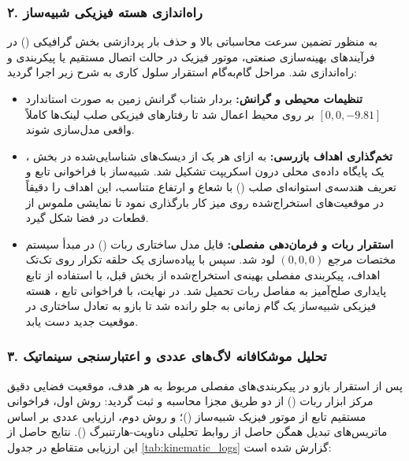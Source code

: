 \documentclass{article}
\begin{document}
\subsubsection*{۲. راه‌اندازی هسته فیزیکی شبیه‌ساز }

به منظور تضمین سرعت محاسباتی بالا و حذف بار پردازشی بخش گرافیکی () در فرآیندهای بهینه‌سازی صنعتی، موتور فیزیک  در حالت اتصال مستقیم یا  پیکربندی و راه‌اندازی شد. مراحل گام‌به‌گام استقرار سلول کاری به شرح زیر اجرا گردید:

\begin{itemize}
	\item \textbf{تنظیمات محیطی و گرانش:} بردار شتاب گرانش زمین به صورت استاندارد $[0, 0, -9.81]$ بر روی محیط اعمال شد تا رفتارهای فیزیکی صلب لینک‌ها کاملاً واقعی مدل‌سازی شوند.
	\item \textbf{تخم‌گذاری اهداف بازرسی:} به ازای هر یک از دیسک‌های شناسایی‌شده در بخش ، یک پایگاه داده‌ی محلی درون اسکریپت تشکیل شد. شبیه‌ساز با فراخوانی تابع  و تعریف هندسه‌ی استوانه‌ای صلب () با شعاع و ارتفاع متناسب، این اهداف را دقیقاً در موقعیت‌های استخراج‌شده روی میز کار بارگذاری نمود تا نمایشی ملموس از قطعات در فضا شکل گیرد.
	\item \textbf{استقرار ربات و فرمان‌دهی مفصلی:} فایل مدل ساختاری ربات () در مبدأ سیستم مختصات مرجع $(0,0,0)$ لود شد. سپس با پیاده‌سازی یک حلقه تکرار روی تک‌تک اهداف، پیکربندی مفصلی بهینه‌ی استخراج‌شده از بخش قبل، با استفاده از تابع پایداری صلح‌آمیز  به مفاصل ربات تحمیل شد. در نهایت، با فراخوانی تابع ، هسته فیزیکی شبیه‌ساز یک گام زمانی به جلو رانده شد تا بازو به تعادل ساختاری در موقعیت جدید دست یابد.
\end{itemize}

\subsubsection*{۳. تحلیل موشکافانه لاگ‌های عددی و اعتبارسنجی سینماتیک}

پس از استقرار بازو در پیکربندی‌های مفصلی مربوط به هر هدف، موقعیت فضایی دقیق مرکز ابزار ربات () از دو طریق مجزا محاسبه و ثبت گردید: روش اول، فراخوانی مستقیم تابع  از موتور فیزیک شبیه‌ساز ()؛ و روش دوم، ارزیابی عددی بر اساس ماتریس‌های تبدیل همگن حاصل از روابط تحلیلی دناویت-هارتنبرگ (). نتایج حاصل از این ارزیابی متقاطع در جدول \ref{tab:kinematic_logs} گزارش شده است:
\end{document}
